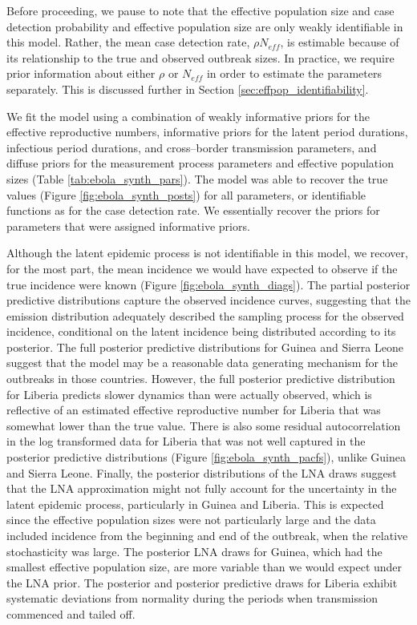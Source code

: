 Before proceeding, we pause to note that the effective population size and case detection probability and effective population size are only weakly identifiable in this model. Rather, the mean case detection rate, $ \rho N_{eff} $, is estimable because of its relationship to the true and observed outbreak sizes. In practice, we require prior information about either $ \rho $ or $ N_{eff} $ in order to estimate the parameters separately. This is discussed further in Section \ref{sec:effpop_identifiability}. 

We fit the model using a combination of weakly informative priors for the effective reproductive numbers, informative priors for the latent period durations, infectious period durations, and cross--border transmission parameters, and diffuse priors for the measurement process parameters and effective population sizes (Table \ref{tab:ebola_synth_pars}). The model was able to recover the true values (Figure \ref{fig:ebola_synth_posts}) for all parameters, or identifiable functions as for the case detection rate. We essentially recover the priors for parameters that were assigned informative priors. 

Although the latent epidemic process is not identifiable in this model, we recover, for the most part, the mean incidence we would have expected to observe if the true incidence were known (Figure \ref{fig:ebola_synth_diags}). The partial posterior predictive distributions capture the observed incidence curves, suggesting that the emission distribution adequately described the sampling process for the observed incidence, conditional on the latent incidence being distributed according to its posterior. The full posterior predictive distributions for Guinea and Sierra Leone suggest that the model may be a reasonable data generating mechanism for the outbreaks in those countries. However, the full posterior predictive distribution for Liberia predicts slower dynamics than were actually observed, which is reflective of an estimated effective reproductive number for Liberia that was somewhat lower than the true value. There is also some residual autocorrelation in the log transformed data for Liberia that was not well captured in the posterior predictive distributions (Figure \ref{fig:ebola_synth_pacfs}), unlike Guinea and Sierra Leone. Finally, the posterior distributions of the LNA draws suggest that the LNA approximation might not fully account for the uncertainty in the latent epidemic process, particularly in Guinea and Liberia. This is expected since the effective population sizes were not particularly large and the data included incidence from the beginning and end of the outbreak, when the relative stochasticity was large. The posterior LNA draws for Guinea, which had the smallest effective population size, are more variable than we would expect under the LNA prior. The posterior and posterior predictive draws for Liberia exhibit systematic deviations from normality during the periods when transmission commenced and tailed off.


